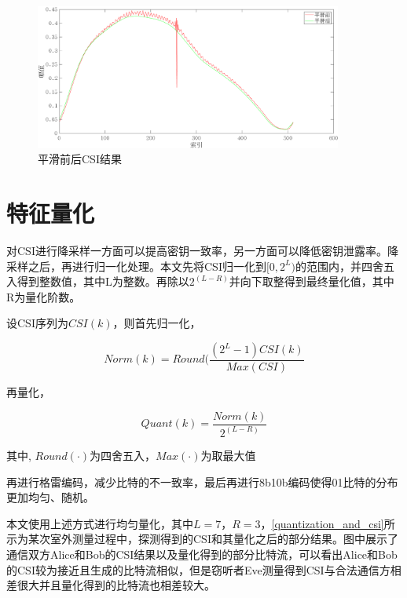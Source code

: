 \documentclass[master]{seuthesis} %
\begin{document}
\begin{Main}
\begin{figure}[htbp!]
    \centering \includegraphics[width=0.9\textwidth]{images/ma_before_after_res} 
    \caption{平滑前后CSI结果}
    \label{ma_before_after_res}
\end{figure}

\section{特征量化}

对CSI进行降采样一方面可以提高密钥一致率，另一方面可以降低密钥泄露率。降采样之后，再进行归一化处理。本文先将CSI归一化到$[0, 2^L)$的范围内，并四舍五入得到整数值，其中L为整数。再除以$2^(L - R)$并向下取整得到最终量化值，其中R为量化阶数。

设CSI序列为$CSI(k)$，则首先归一化，

\begin{equation}
    Norm(k) = Round(\frac{(2^L - 1) CSI(k)}{Max(CSI)}
\end{equation}

再量化，

\begin{equation}
    Quant(k) = \frac{Norm(k)}{2^{(L - R)}}
\end{equation}

其中, $Round(\cdot)$为四舍五入，$Max(\cdot)$为取最大值

再进行格雷编码，减少比特的不一致率，最后再进行8b10b编码使得01比特的分布更加均匀、随机。

本文使用上述方式进行均匀量化，其中$L = 7$，$R = 3$，\ref{quantization_and_csi}所示为某次室外测量过程中，探测得到的CSI和其量化之后的部分结果。图中展示了通信双方Alice和Bob的CSI结果以及量化得到的部分比特流，可以看出Alice和Bob的CSI较为接近且生成的比特流相似，但是窃听者Eve测量得到CSI与合法通信方相差很大并且量化得到的比特流也相差较大。


\end{Main}
\end{document}

